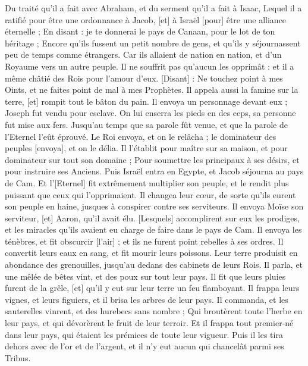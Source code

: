 \begin{multicols}{2}
Du traité qu'il a fait avec Abraham, et du serment qu'il a fait à Isaac,
Lequel il a ratifié pour être une ordonnance à Jacob, [et] à Israël [pour] être une alliance éternelle ;
En disant : je te donnerai le pays de Canaan, pour le lot de ton héritage ;
Encore qu'ils fussent un petit nombre de gens, et qu'ils y séjournassent peu de temps comme étrangers.
Car ils allaient de nation en nation, et d'un Royaume vers un autre peuple.
Il ne souffrit pas qu'aucun les opprimât : et il a même châtié des Rois pour l'amour d'eux.
[Disant] : Ne touchez point à mes Oints, et ne faites point de mal à mes Prophètes.
Il appela aussi la famine sur la terre, [et] rompit tout le bâton du pain.
Il envoya un personnage devant eux ; Joseph fut vendu pour esclave.
On lui enserra les pieds en des ceps, sa personne fut mise aux fers.
Jusqu’au temps que sa parole fût venue, et que la parole de l'Eternel l'eût éprouvé.
Le Roi envoya, et on le relâcha ; le dominateur des peuples [envoya], et on le délia.
Il l'établit pour maître sur sa maison, et pour dominateur sur tout son domaine ;
Pour soumettre les principaux à ses désirs, et pour instruire ses Anciens.
Puis Israël entra en Egypte, et Jacob séjourna au pays de Cam.
Et l'[Eternel] fit extrêmement multiplier son peuple, et le rendit plus puissant que ceux qui l'opprimaient.
Il changea leur cœur, de sorte qu'ils eurent son peuple en haine, jusques à conspirer contre ses serviteurs.
Il envoya Moïse son serviteur, [et] Aaron, qu'il avait élu.
[Lesquels] accomplirent sur eux les prodiges, et les miracles qu'ils avaient eu charge de faire dans le pays de Cam.
Il envoya les ténèbres, et fit obscurcir [l'air] ; et ils ne furent point rebelles à ses ordres.
Il convertit leurs eaux en sang, et fit mourir leurs poissons.
Leur terre produisit en abondance des grenouilles, jusqu’au dedans des cabinets de leurs Rois.
Il parla, et une mêlée de bêtes vint, et des poux sur tout leur pays.
Il fit que leurs pluies furent de la grêle, [et] qu'il y eut sur leur terre un feu flamboyant.
Il frappa leurs vignes, et leurs figuiers, et il brisa les arbres de leur pays.
Il commanda, et les sauterelles vinrent, et des hurebecs sans nombre ;
Qui broutèrent toute l'herbe en leur pays, et qui dévorèrent le fruit de leur terroir.
Et il frappa tout premier-né dans leur pays, qui étaient les prémices de toute leur vigueur.
Puis il les tira dehors avec de l'or et de l'argent, et il n'y eut aucun qui chancelât parmi ses Tribus.

\end{multicols}
